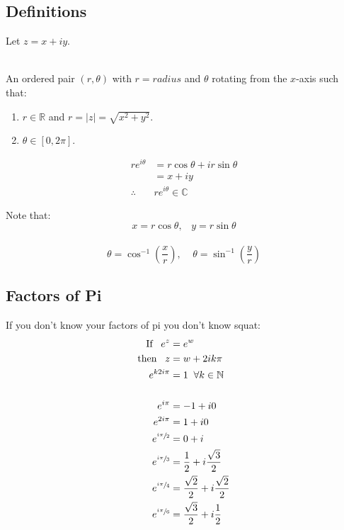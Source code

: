 \subsection{Definitions}
Let $z = x +iy.$ \\
\\
\begin{defn}
	An ordered pair $(r, \theta)$ with $r = radius$ and $\theta$ rotating from the $x$-axis such that:
	\begin{enumerate}
		\item $r \in \mathbb{R}$ and $r = |z| = \sqrt{x^2 + y^2}.$
		\item $\theta  \in [0, 2\pi].$
	\end{enumerate}
\end{defn}
\begin{defn}
	\begin{align*}
		re^{i\theta} &= r\cos{\theta} + ir\sin{\theta} \\
		&= x + iy \\
		\therefore \;\; &re^{i\theta} \in \mathbb{C}
	\end{align*}
\end{defn}
Note that:
\[x = r\cos{\theta}, \;\;\; y = r\sin{\theta}\]\\
\[\theta = \cos^{-1}{ \left( \frac{x}{r} \right)  }, \;\;\;\; \theta = \sin^{-1} \left( { \frac{y}{r} } \right) \]
\subsection{Factors of Pi}
\begin{defn}
	If you don't know your factors of pi you don't know squat:
	\begin{align*}
		\text{If} \;\;\; e^z &= e^w \\ 
		\text{then} \;\;\; z &= w + 2ik\pi \\
		e^{k2i\pi} &= 1 \;\; \forall k \in \mathbb{N} \\
		\\
		e^{i\pi} &= -1 + i0 \\ 
		e^{2i\pi} &= 1 + i0 \\ 
		e^{\sfrac{i\pi}{2}} &= 0 +  i \\
		e^{\sfrac{i\pi}{3}} &= \frac{1}{2} + i\frac{\sqrt{3}}{2} \\
		e^{\sfrac{i\pi}{4}} &= \frac{\sqrt{2}}{2} + i\frac{\sqrt{2}}{2} \\
		e^{\sfrac{i\pi}{6}} &= \frac{\sqrt{3}}{2} + i\frac{1}{2}\\
	\end{align*}
\end{defn}
 
